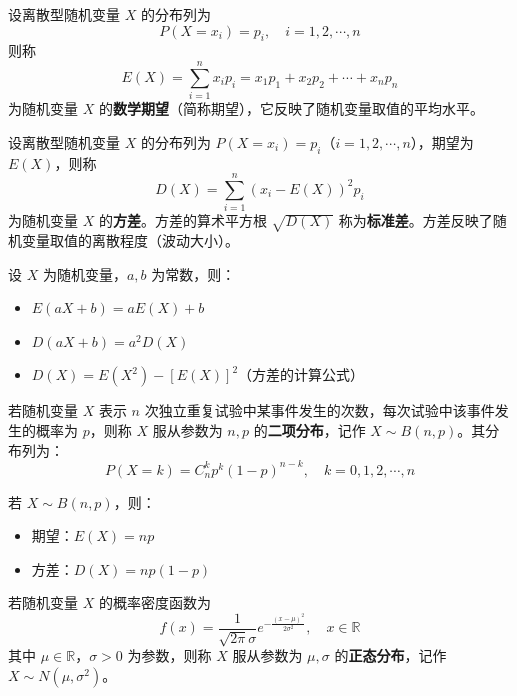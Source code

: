 \documentclass[11pt]{ctexrep}
\begin{document}
\begin{definition}[数学期望]
    设离散型随机变量 $X$ 的分布列为
    \[
        P(X = x_i) = p_i, \quad i = 1, 2, \cdots, n
    \]
    则称
    \[
        E(X) = \sum_{i=1}^{n} x_i p_i = x_1 p_1 + x_2 p_2 + \cdots + x_n p_n
    \]
    为随机变量 $X$ 的\textbf{数学期望}（简称期望），它反映了随机变量取值的平均水平。
\end{definition}

\begin{definition}[方差]
    设离散型随机变量 $X$ 的分布列为 $P(X = x_i) = p_i$（$i = 1, 2, \cdots, n$），期望为 $E(X)$，则称
    \[
        D(X) = \sum_{i=1}^{n} (x_i - E(X))^2 p_i
    \]
    为随机变量 $X$ 的\textbf{方差}。方差的算术平方根 $\sqrt{D(X)}$ 称为\textbf{标准差}。方差反映了随机变量取值的离散程度（波动大小）。
\end{definition}

\begin{property}[期望与方差的性质]
    设 $X$ 为随机变量，$a, b$ 为常数，则：
    \begin{itemize}
        \item $E(aX + b) = aE(X) + b$
        \item $D(aX + b) = a^2 D(X)$
        \item $D(X) = E(X^2) - [E(X)]^2$（方差的计算公式）
    \end{itemize}
\end{property}

\begin{definition}[二项分布]
    若随机变量 $X$ 表示 $n$ 次独立重复试验中某事件发生的次数，每次试验中该事件发生的概率为 $p$，则称 $X$ 服从参数为 $n, p$ 的\textbf{二项分布}，记作 $X \sim B(n, p)$。其分布列为：
    \[
        P(X = k) = C_n^k p^k (1-p)^{n-k}, \quad k = 0, 1, 2, \cdots, n
    \]
\end{definition}

\begin{property}[二项分布的期望与方差]
    若 $X \sim B(n, p)$，则：
    \begin{itemize}
        \item 期望：$E(X) = np$
        \item 方差：$D(X) = np(1-p)$
    \end{itemize}
\end{property}

\begin{definition}[正态分布]
    若随机变量 $X$ 的概率密度函数为
    \[
        f(x) = \frac{1}{\sqrt{2\pi}\sigma} e^{-\frac{(x-\mu)^2}{2\sigma^2}}, \quad x \in \mathbb{R}
    \]
    其中 $\mu \in \mathbb{R}$，$\sigma > 0$ 为参数，则称 $X$ 服从参数为 $\mu, \sigma$ 的\textbf{正态分布}，记作 $X \sim N(\mu, \sigma^2)$。
\end{definition}
\end{document}
